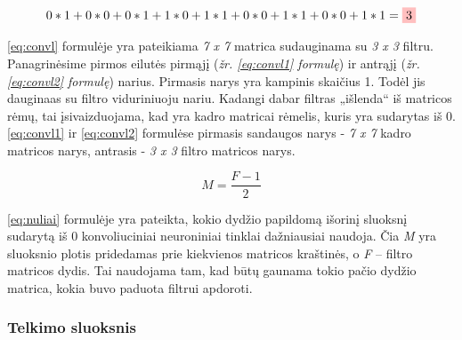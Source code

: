 \documentclass{VUMIFInfKursinis}
\begin{document}
\begin{equation}\label{eq:convl2}
0*1+0*0+0*1+1*0+1*1+0*0+1*1+0*0+1*1=\colorbox{pink}{3}
\end{equation}

\ref{eq:convl} formulėje yra pateikiama \textit{7 x 7} matrica sudauginama su \textit{3 x 3} filtru. Panagrinėsime pirmos eilutės pirmąjį (\textit{žr. \ref{eq:convl1} formulę}) ir antrąjį (\textit{žr. \ref{eq:convl2} formulę}) narius. Pirmasis narys yra kampinis skaičius 1. Todėl jis dauginaas su filtro viduriniuoju nariu. Kadangi dabar filtras „išlenda“ iš matricos rėmų, tai įsivaizduojama, kad yra kadro matricai rėmelis, kuris yra sudarytas iš 0. \ref{eq:convl1} ir \ref{eq:convl2} formulėse pirmasis sandaugos narys - \textit{7 x 7} kadro matricos narys, antrasis - \textit{3 x 3} filtro matricos narys.

\begin{equation}\label{eq:nuliai}
M=\frac{F-1}{2}
\end{equation}

\ref{eq:nuliai} formulėje yra pateikta, kokio dydžio papildomą išorinį sluoksnį sudarytą iš 0 konvoliuciniai neuroniniai tinklai dažniausiai naudoja. Čia \textit{M} yra sluoksnio plotis pridedamas prie kiekvienos matricos kraštinės, o \textit{F} – filtro matricos dydis. Tai naudojama tam, kad būtų gaunama tokio pačio dydžio matrica, kokia buvo paduota filtrui apdoroti.


\subsubsection{Telkimo sluoksnis}
\end{document}
